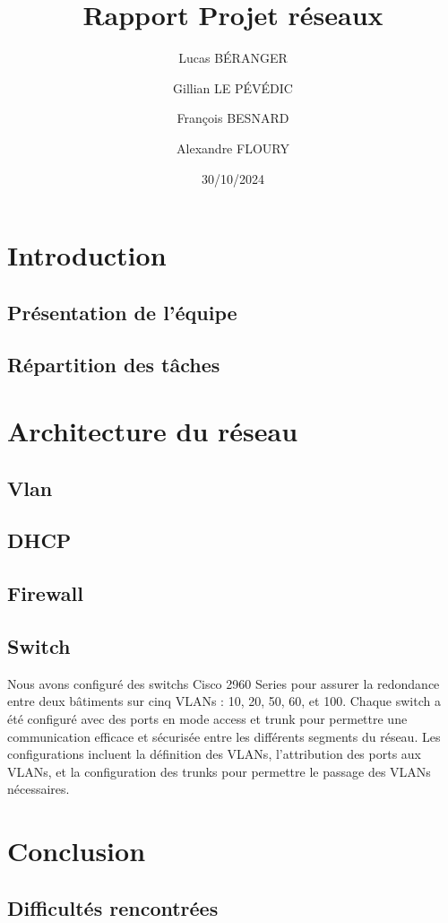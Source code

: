 \documentclass[a4paper,12pt]{report}
\title{Rapport Projet réseaux}
\author{
    Lucas BÉRANGER \and 
    Gillian LE PÉVÉDIC \and
    François BESNARD \and
    Alexandre FLOURY \and
}
\date{30/10/2024}
\begin{document}
    \maketitle  
    \newpage

    \tableofcontents
    \newpage

    \chapter{Introduction}
        \section{Présentation de l'équipe}
        \section{Répartition des tâches}


    \chapter{Architecture du réseau}
        \section{Vlan}
        \section{DHCP}
        \section{Firewall}
        \section{Switch}
        Nous avons configuré des switchs Cisco 2960 Series pour assurer la redondance entre deux bâtiments sur cinq VLANs : 10, 20, 50, 60, et 100. Chaque switch a été configuré avec des ports en mode access et trunk pour permettre une communication efficace et sécurisée entre les différents segments du réseau. Les configurations incluent la définition des VLANs, l'attribution des ports aux VLANs, et la configuration des trunks pour permettre le passage des VLANs nécessaires.

    \chapter{Conclusion}
        \section{Difficultés rencontrées}
\end{document}
